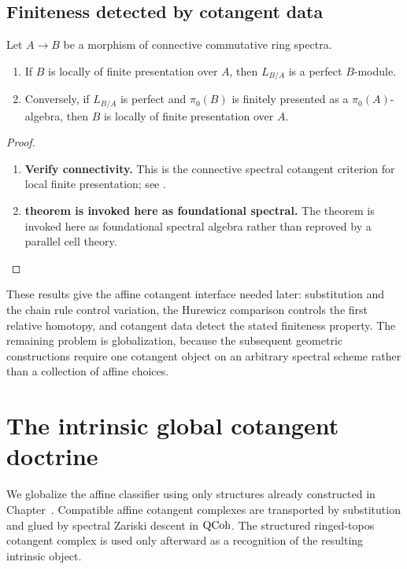 \subsection{Finiteness detected by cotangent data}

\begin{theorem}
\label{thm:cotangent-finite-presentation}
Let \(A\to B\) be a morphism of connective commutative ring spectra.
\begin{enumerate}[label=(\roman*)]
    \item If \(B\) is locally of finite presentation over \(A\), then
    \(L_{B/A}\) is a perfect \(B\)-module.
    \item Conversely, if \(L_{B/A}\) is perfect and \(\pi_0(B)\) is finitely
    presented as a \(\pi_0(A)\)-algebra, then \(B\) is locally of finite
    presentation over \(A\).
\end{enumerate}
\end{theorem}

\begin{proof}
\leavevmode
\begin{enumerate}[label=\textup{(\arabic*)}]
    \item \textbf{Verify connectivity.}
    This is the connective spectral cotangent criterion for local finite presentation; see
    \cite{LurieDAGIV,LurieHigherAlgebra,LurieSAG}.

    \item \textbf{theorem is invoked here as foundational spectral.}
    The theorem is invoked here as foundational spectral algebra rather than reproved by a
    parallel cell theory.
\end{enumerate}
\end{proof}
These results give the affine cotangent interface needed later: substitution
and the chain rule control variation, the Hurewicz comparison controls the
first relative homotopy, and cotangent data detect the stated finiteness
property. The remaining problem is globalization, because the subsequent
geometric constructions require one cotangent object on an arbitrary spectral
scheme rather than a collection of affine choices.

\section{The intrinsic global cotangent doctrine}
\label{sec:global-cotangent-doctrine}

We globalize the affine classifier using only structures already constructed in
Chapter~. Compatible affine cotangent
complexes are transported by substitution and glued by spectral Zariski
descent in \(\operatorname{QCoh}\). The structured ringed-topos cotangent complex is used
only afterward as a recognition of the resulting intrinsic object.

